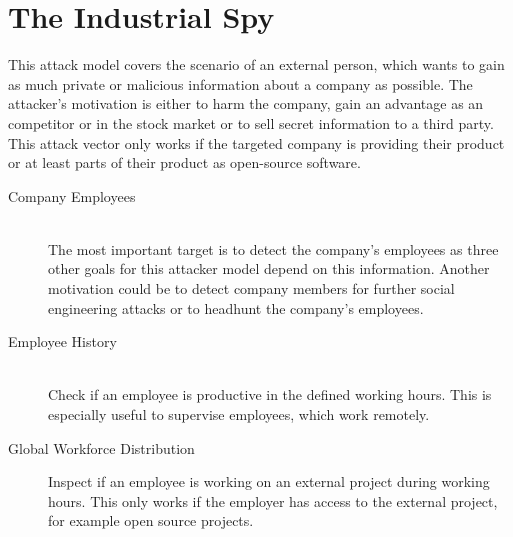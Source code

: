 \section{The Industrial Spy}

This attack model covers the scenario of an external person, which wants to gain as much private or malicious information about a company as possible.
The attacker's motivation is either to harm the company, gain an advantage as an competitor or in the stock market or to sell secret information to a third party.
This attack vector only works if the targeted company is providing their product or at least parts of their product as open-source software.


\begin{description}
    \item[Company Employees] \hfill \\
        The most important target is to detect the company's employees as three other goals for this attacker model depend on this information.
        Another motivation could be to detect company members for further social engineering attacks or to headhunt the company's employees.

    \item[Employee History] \hfill \\
        Check if an employee is productive in the defined working hours.
        This is especially useful to supervise employees, which work remotely.

    \item[Global Workforce Distribution] \hfill
        Inspect if an employee is working on an external project during working hours.
        This only works if the employer has access to the external project, for example open source projects.


\end{description}
